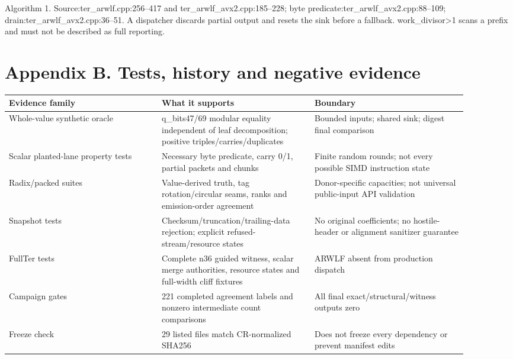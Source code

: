 \documentclass[10pt,letterpaper]{article}
\begin{document}
{\small\color{teal}Algorithm 1. Source:ter\_arwlf.cpp:256--417 and ter\_arwlf\_avx2.cpp:185--228; byte predicate:ter\_arwlf\_avx2.cpp:88--109; drain:ter\_arwlf\_avx2.cpp:36--51. A dispatcher discards partial output and resets the sink before a fallback. work\_divisor>1 scans a prefix and must not be described as full reporting.\par}

\section*{Appendix B. Tests, history and negative evidence}

{\small\setlength{\tabcolsep}{3pt}\begin{longtable}{p{0.301\linewidth} p{0.301\linewidth} p{0.301\linewidth}}
\toprule

\textbf{Evidence family} & \textbf{What it supports} & \textbf{Boundary} \\
\midrule\endhead

Whole-value synthetic oracle & q\_bits47/69 modular equality independent of leaf decomposition; positive triples/carries/duplicates & Bounded inputs; shared sink; digest final comparison \\

Scalar planted-lane property tests & Necessary byte predicate, carry 0/1, partial packets and chunks & Finite random rounds; not every possible SIMD instruction state \\

Radix/packed suites & Value-derived truth, tag rotation/circular seams, ranks and emission-order agreement & Donor-specific capacities; not universal public-input API validation \\

Snapshot tests & Checksum/truncation/trailing-data rejection; explicit refused-stream/resource states & No original coefficients; no hostile-header or alignment sanitizer guarantee \\

FullTer tests & Complete n36 guided witness, scalar merge authorities, resource states and full-width cliff fixtures & ARWLF absent from production dispatch \\

Campaign gates & 221 completed agreement labels and nonzero intermediate count comparisons & All final exact/structural/witness outputs zero \\

Freeze check & 29 listed files match CR-normalized SHA256 & Does not freeze every dependency or prevent manifest edits \\

\bottomrule\end{longtable}}
\end{document}

